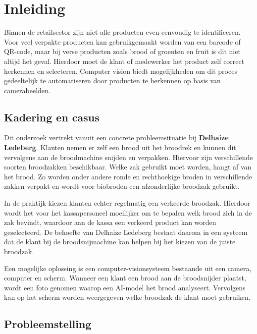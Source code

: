 
\section{Inleiding}
\label{sec:inleiding}

Binnen de retailsector zijn niet alle producten even eenvoudig te identificeren. Voor veel verpakte producten kan gebruikgemaakt worden van een barcode of QR-code, maar bij verse producten zoals brood of groenten en fruit is dit niet altijd het geval. Hierdoor moet de klant of medewerker het product zelf correct herkennen en selecteren. Computer vision biedt mogelijkheden om dit proces gedeeltelijk te automatiseren door producten te herkennen op basis van camerabeelden.

\subsection{Kadering en casus}

Dit onderzoek vertrekt vanuit een concrete probleemsituatie bij \textbf{Delhaize Ledeberg}. Klanten nemen er zelf een brood uit het broodrek en kunnen dit vervolgens aan de broodmachine snijden en verpakken. Hiervoor zijn verschillende soorten broodzakken beschikbaar. Welke zak gebruikt moet worden, hangt af van het brood. Zo worden onder andere ronde en rechthoekige broden in verschillende zakken verpakt en wordt voor biobroden een afzonderlijke broodzak gebruikt.

In de praktijk kiezen klanten echter regelmatig een verkeerde broodzak. Hierdoor wordt het voor het kassapersoneel moeilijker om te bepalen welk brood zich in de zak bevindt, waardoor aan de kassa een verkeerd product kan worden geselecteerd. De behoefte van Delhaize Ledeberg bestaat daarom in een systeem dat de klant bij de broodsnijmachine kan helpen bij het kiezen van de juiste broodzak.

Een mogelijke oplossing is een computer-vision\-sys\-teem bestaande uit een camera, computer en scherm. Wanneer een klant een brood aan de broodsnijder plaatst, wordt een foto genomen waarop een AI-model het brood analyseert. Vervolgens kan op het scherm worden weergegeven welke broodzak de klant moet gebruiken.

\subsection{Probleemstelling}


